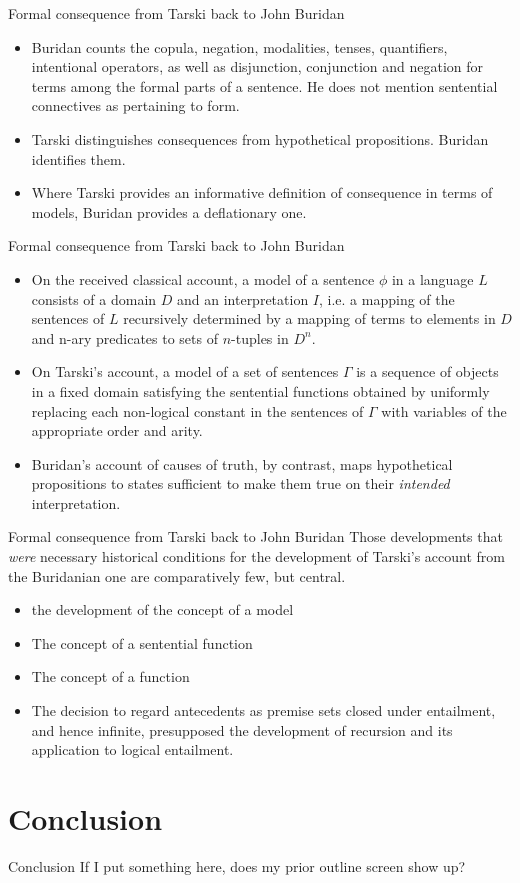 \documentclass{beamer}
\begin{document}
\begin{frame}{Formal consequence from Tarski back to John Buridan}
	\begin{itemize}
		\pause 
		\item Buridan counts the copula, negation, modalities, tenses, quantifiers, intentional operators, as well as disjunction, conjunction and negation for terms among the formal parts of a sentence. He does not mention sentential connectives as pertaining to form.
		\pause
		\item Tarski distinguishes consequences from hypothetical propositions. Buridan identifies them.
		\pause 
		\item Where Tarski provides an informative definition of consequence in terms of models, Buridan provides a deflationary one.
	\end{itemize}
\end{frame}

\begin{frame}{Formal consequence from Tarski back to John Buridan}
	\begin{itemize}
		\pause 
		\item On the received classical account, a model of a sentence $\phi$ in a language $L$ consists of a domain $D$ and an interpretation $I$, i.e. a mapping of the sentences of $L$ recursively determined by a mapping of terms to elements in $D$ and n-ary predicates to sets of $n$-tuples in $D^{n}$.
		\pause	
		\item On Tarski's account, a model of a set of sentences $\Gamma$ is a sequence of objects in a fixed domain satisfying the sentential functions obtained by uniformly replacing each non-logical constant in the sentences of $\Gamma$ with variables of the appropriate order and arity. 
		\pause
		\item Buridan's account of causes of truth, by contrast, maps hypothetical propositions to states sufficient to make them true on their \textit{intended} interpretation.
	\end{itemize}
\end{frame}	 	

\begin{frame}{Formal consequence from Tarski back to John Buridan}
	Those developments that \textit{were} necessary historical conditions for the development of Tarski's account from the Buridanian one are comparatively few, but central. 
	\begin{itemize}
		\pause 
		\item the development of the concept of a model
		\pause 
		\item The concept of a sentential function
		\item The concept of a function
		\pause
		\item The decision to regard antecedents as premise sets closed under entailment, and hence infinite, presupposed the development of recursion and its application to logical entailment.
	\end{itemize}
\end{frame}
\section{Conclusion}
\begin{frame}{Conclusion}
	If I put something here, does my prior outline screen show up?
\end{frame}
\end{document}
